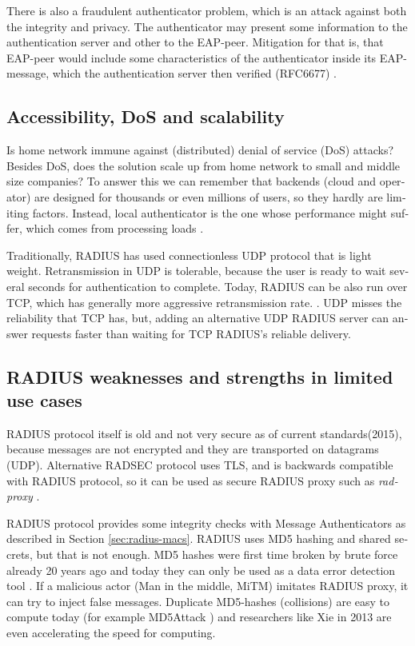 \documentclass[12pt,a4paper,english]{tutthesis}
\begin{document}
\begin{otherlanguage}{english}
There is also a fraudulent authenticator problem, which is an attack
against both the integrity and privacy.  The authenticator may present
some information to the authentication server and other to the
EAP-peer. Mitigation for that is, that EAP-peer would include some
characteristics of the authenticator inside its EAP-message, which
the authentication server then verified (RFC6677) \cite{rfc6677}.

\subsection{Accessibility, DoS and scalability}
\label{sec-6-1-3}

Is home network immune against (distributed) denial of service (DoS)
attacks? Besides DoS, does the solution scale up from home network to
small and middle size companies?
To answer this we can remember that backends (cloud and operator) are
designed for thousands or even millions of users, so 
they hardly are limiting factors. Instead, local
authenticator is the one whose performance might suffer, which
comes from processing loads \cite{2009-lin-simefficiency}.


Traditionally, RADIUS has used connection\-less UDP protocol that is
light weight. Retransmission in UDP is tolerable, because the user is
ready to wait several seconds for authentication to complete.  
Today, RADIUS can be also run over TCP, which has generally more
aggressive retransmission rate. \cite[Section 2.2.1]{rfc5080}.
UDP misses the reliability that TCP has, but, adding an alternative UDP RADIUS
server can answer requests faster than waiting for TCP RADIUS's reliable delivery.


\subsection{RADIUS weaknesses and strengths in limited use cases}
\label{sec-6-1-4}


RADIUS protocol itself is old and not very secure as of current
standards(2015), because messages are not encrypted and they are
transported on datagrams (UDP). Alternative RADSEC protocol uses TLS, and 
is backwards compatible with RADIUS protocol, so it can be used
as secure RADIUS proxy such as \emph{radproxy} \cite{uninett-radproxy}.

RADIUS protocol provides some integrity checks with Message
Authenticators as described in Section \ref{sec:radius-macs}.  RADIUS uses
MD5 hashing and shared secrets, but that is not enough.  MD5 hashes
were first time broken by brute force already 20 years ago and today
they can only be used as a data error detection
tool \cite[p.2]{rfc6151}.  If a malicious actor (Man in the middle,
MiTM) imitates RADIUS proxy, it can try to inject false messages.
Duplicate MD5-hashes (collisions) are easy to compute today (for 
example MD5Attack \cite{rfc5176}) and researchers like Xie in
2013 \cite{xie2013fast}  are even accelerating the speed for
computing.


\end{otherlanguage}
\end{document}
